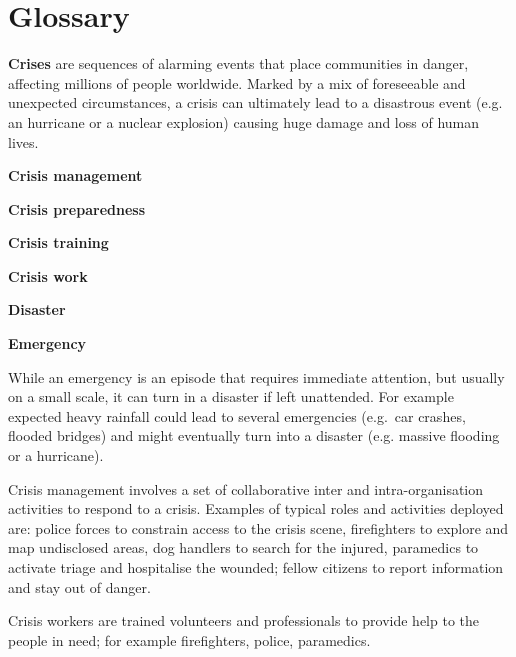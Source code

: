 \chapter{Glossary} \label{glossary}

\textbf{Crises} are sequences of alarming events that place communities in danger, affecting millions of people worldwide. Marked by a mix of foreseeable and unexpected circumstances, a crisis can ultimately lead to a disastrous event (e.g. an hurricane or a nuclear explosion) causing huge damage and loss of human lives.

\textbf{Crisis management}

\textbf{Crisis preparedness}

\textbf{Crisis training}

\textbf{Crisis work}

\textbf{Disaster}

\textbf{Emergency}

While an emergency is an episode that requires immediate attention, but usually on a small scale, it can turn in a disaster if left unattended. For example expected heavy rainfall could lead to several emergencies (e.g.~car crashes, flooded bridges) and might eventually turn into a disaster (e.g. massive flooding or a hurricane).

Crisis management involves a set of collaborative inter and intra-organisation activities to respond to a crisis. Examples of typical roles and activities deployed are: police forces to constrain access to the crisis scene, firefighters to explore and map undisclosed areas, dog handlers to search for the injured, paramedics to activate triage and hospitalise the wounded; fellow citizens to report information and stay out of danger.

Crisis workers are trained volunteers and professionals to provide help to the people in need; for example firefighters, police, paramedics.